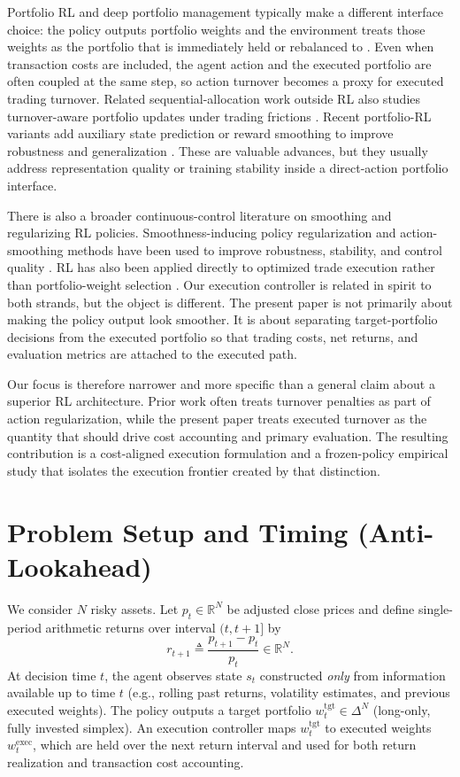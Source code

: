 \documentclass[10pt,twocolumn]{article}
\newcommand{\wexec}{w^{\mathrm{exec}}}
\newcommand{\wtgt}{w^{\mathrm{tgt}}}
\newcommand{\R}{\mathbb{R}}
\newcommand{\DeltaN}{\Delta^N}
\begin{document}
Portfolio RL and deep portfolio management typically make a different interface choice: the policy outputs portfolio weights and the environment treats those weights as the portfolio that is immediately held or rebalanced to \cite{moody1998,jiang2017,ye2020}. Even when transaction costs are included, the agent action and the executed portfolio are often coupled at the same step, so action turnover becomes a proxy for executed trading turnover. Related sequential-allocation work outside RL also studies turnover-aware portfolio updates under trading frictions \cite{li2014}. Recent portfolio-RL variants add auxiliary state prediction or reward smoothing to improve robustness and generalization \cite{ye2020,lien2023}. These are valuable advances, but they usually address representation quality or training stability inside a direct-action portfolio interface.

There is also a broader continuous-control literature on smoothing and regularizing RL policies. Smoothness-inducing policy regularization and action-smoothing methods have been used to improve robustness, stability, and control quality \cite{shen2020,mysore2021}. RL has also been applied directly to optimized trade execution rather than portfolio-weight selection \cite{nevmyvaka2006}. Our execution controller is related in spirit to both strands, but the object is different. The present paper is not primarily about making the policy output look smoother. It is about separating target-portfolio decisions from the executed portfolio so that trading costs, net returns, and evaluation metrics are attached to the executed path.

Our focus is therefore narrower and more specific than a general claim about a superior RL architecture. Prior work often treats turnover penalties as part of action regularization, while the present paper treats executed turnover as the quantity that should drive cost accounting and primary evaluation. The resulting contribution is a cost-aligned execution formulation and a frozen-policy empirical study that isolates the execution frontier created by that distinction.

\section{Problem Setup and Timing (Anti-Lookahead)}
\label{sec:setup}
We consider $N$ risky assets. Let $p_t\in\R^N$ be adjusted close prices and define single-period arithmetic returns over interval $(t,t{+}1]$ by
\[
r_{t+1} \triangleq \frac{p_{t+1}-p_t}{p_t}\in\R^N.
\]
At decision time $t$, the agent observes state $s_t$ constructed \emph{only} from information available up to time $t$ (e.g., rolling past returns, volatility estimates, and previous executed weights). The policy outputs a target portfolio $\wtgt_t\in\DeltaN$ (long-only, fully invested simplex). An execution controller maps $\wtgt_t$ to executed weights $\wexec_t$, which are held over the next return interval and used for both return realization and transaction cost accounting.
\end{document}
